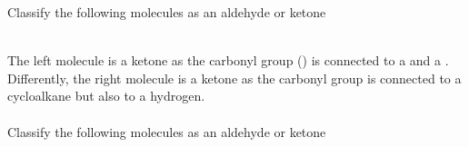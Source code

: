 \documentclass[main.tex]{subfiles}
\begin{document}
\begin{description}
\begin{example} %
Classify the following molecules as an aldehyde or ketone
\begin{center} \hspace{0.5cm}  \end{center}
\\
The left molecule is a ketone as the carbonyl group () is connected to a  and a  . Differently, the right molecule is a ketone as the carbonyl group is connected to a cycloalkane but also to a hydrogen. 
\\
\faDiamond\ \\
Classify the following molecules as an aldehyde or ketone
\begin{center} \hspace{0.5cm}  \end{center}
\end{example}%


\end{description}
\end{document}
